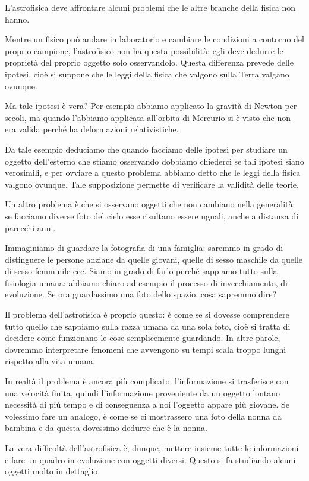 L'astrofisica deve affrontare alcuni problemi che le altre branche della fisica non hanno.

Mentre un fisico può andare in laboratorio e cambiare le condizioni a contorno del proprio campione, l'astrofisico non ha questa possibilità: egli deve dedurre le proprietà del proprio oggetto solo osservandolo. Questa differenza prevede delle ipotesi, cioè si suppone che le leggi della fisica che valgono sulla Terra valgano ovunque.

Ma tale ipotesi è vera? Per esempio abbiamo applicato la gravità di Newton per secoli, ma quando l'abbiamo applicata all'orbita di Mercurio si è visto che non era valida perché ha deformazioni relativistiche.

Da tale esempio deduciamo che quando facciamo delle ipotesi per studiare un oggetto dell'esterno che stiamo osservando dobbiamo chiederci se tali ipotesi siano verosimili, e per ovviare a questo problema abbiamo detto che le leggi della fisica valgono ovunque. Tale supposizione permette di verificare la validità delle teorie.

\vspace{0.2cm}Un altro problema è che si osservano oggetti che non cambiano nella generalità: se facciamo diverse foto del cielo esse risultano essere uguali, anche a distanza di parecchi anni.

Immaginiamo di guardare la fotografia di una famiglia: saremmo in grado di distinguere le persone anziane da quelle giovani, quelle di sesso maschile da quelle di sesso femminile ecc. Siamo in grado di farlo perché sappiamo tutto sulla fisiologia umana: abbiamo chiaro ad esempio il processo di invecchiamento, di evoluzione. Se ora guardassimo una foto dello spazio, cosa sapremmo dire?

Il problema dell'astrofisica è proprio questo: è come se si dovesse comprendere tutto quello che sappiamo sulla razza umana da una sola foto, cioè si tratta di decidere come funzionano le cose semplicemente guardando. In altre parole, dovremmo interpretare fenomeni che avvengono su tempi scala troppo lunghi rispetto alla vita umana.

In realtà il problema è ancora più complicato: l'informazione si trasferisce con una velocità finita, quindi l'informazione proveniente da un oggetto lontano necessità di più tempo e di conseguenza a noi l'oggetto appare più giovane. Se volessimo fare un analogo, è come se ci mostrassero una foto della nonna da bambina e da questa dovessimo dedurre che è la nonna.

\vspace{0.2cm}La vera difficoltà dell'astrofisica è, dunque, mettere insieme tutte le informazioni e fare un quadro in evoluzione con oggetti diversi. Questo si fa studiando alcuni oggetti molto in dettaglio.